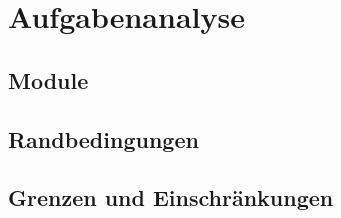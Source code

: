 \chapter{Aufgabenanalyse}
\label{Aufgabenanalyse}

\section{Module}


\section{Randbedingungen}


\section{Grenzen und Einschränkungen}

